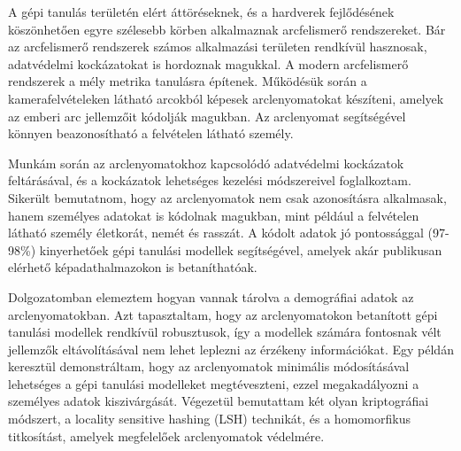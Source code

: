 
A gépi tanulás területén elért áttöréseknek, és a hardverek fejlődésének köszönhetően egyre szélesebb körben alkalmaznak arcfelismerő rendszereket. Bár az arcfelismerő rendszerek számos alkalmazási területen rendkívül hasznosak, adatvédelmi kockázatokat is hordoznak magukkal. A modern arcfelismerő rendszerek a mély metrika tanulásra építenek. Működésük során a kamerafelvételeken látható arcokból képesek arclenyomatokat készíteni, amelyek az emberi arc jellemzőit kódolják magukban. Az arclenyomat segítségével könnyen beazonosítható a felvételen látható személy. 

Munkám során az arclenyomatokhoz kapcsolódó adatvédelmi kockázatok feltárásával, és a kockázatok lehetséges kezelési módszereivel foglalkoztam. Sikerült bemutatnom, hogy az arclenyomatok nem csak azonosításra alkalmasak, hanem személyes adatokat is kódolnak magukban, mint például a felvételen látható személy életkorát, nemét és rasszát. A kódolt adatok jó pontossággal (97-98\%) kinyerhetőek gépi tanulási modellek segítségével, amelyek akár publikusan elérhető képadathalmazokon is betaníthatóak.

Dolgozatomban elemeztem hogyan vannak tárolva a demográfiai adatok az arclenyomatokban. Azt tapasztaltam, hogy az arclenyomatokon betanított gépi tanulási modellek rendkívül robusztusok, így a modellek számára fontosnak vélt jellemzők eltávolításával nem lehet leplezni az érzékeny információkat. Egy példán keresztül demonstráltam, hogy az arclenyomatok minimális módosításával lehetséges a gépi tanulási modelleket megtéveszteni, ezzel megakadályozni a személyes adatok kiszivárgását. Végezetül bemutattam két olyan kriptográfiai módszert, a locality sensitive hashing (LSH) technikát, és a homomorfikus titkosítást, amelyek megfelelőek arclenyomatok védelmére.

